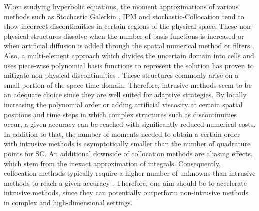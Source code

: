 When studying hyperbolic equations, the moment approximations of various methods such as Stochastic Galerkin \cite{le2004uncertainty}, IPM \cite{kusch2018filtered} and stochastic-Collocation \cite{barth2013non,dwight2013adaptive} tend to show incorrect discontinuities in certain regions of the physical space. These non-physical structures dissolve when the number of basis functions is increased \cite{pettersson2009numerical,offner2017stability} or when artificial diffusion is added through the spatial numerical method \cite{offner2017stability} or filters \cite{kusch2018filtered}. Also, a multi-element approach which divides the uncertain domain into cells and uses piece-wise polynomial basis functions to represent the solution has proven to mitigate non-physical discontinuities \cite{durrwachter2018hyperbolicity}. These structures commonly arise on a small portion of the space-time domain. Therefore, intrusive methods seem to be an adequate choice since they are well suited for adaptive strategies. By locally increasing the polynomial order \cite{tryoen2012adaptive,kroker2012finite,giesselmann2017posteriori} or adding artificial viscosity \cite{kusch2018filtered} at certain spatial positions and time steps in which complex structures such as discontinuities occur, a given accuracy can be reached with significantly reduced numerical costs. In addition to that, the number of moments needed to obtain a certain order with intrusive methods is asymptotically smaller than the number of quadrature points for SC. An additional downside of collocation methods are aliasing effects, which stem from the inexact approximation of integrals. Consequently, collocation methods typically require a higher number of unknowns than intrusive methods to reach a given accuracy \cite{xiu2009fast,alekseev2011estimation}. Therefore, one aim should be to accelerate intrusive methods, since they can potentially outperform non-intrusive methods in complex and high-dimensional settings. \\

